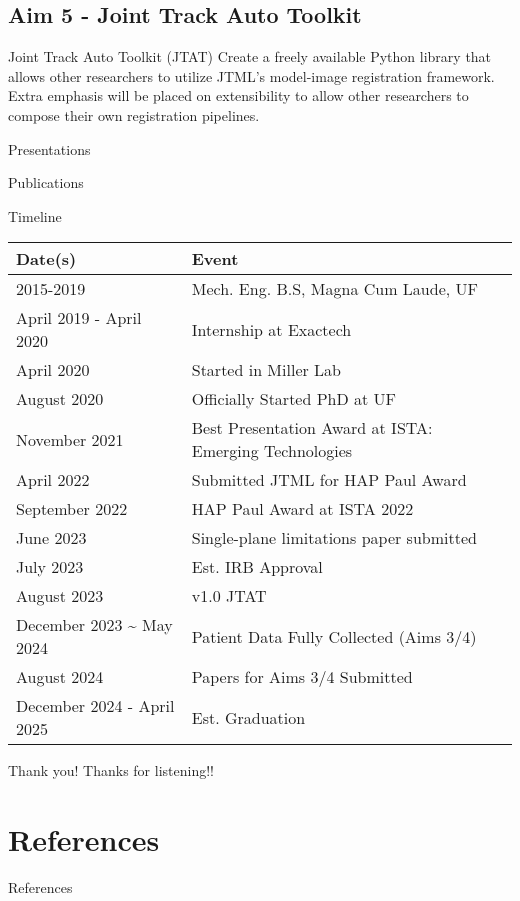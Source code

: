 \documentclass[presentation, aspectratio=1610]{beamer}
\begin{document}
\subsection{Aim 5 - Joint Track Auto Toolkit}
\label{sec:org3f12229}
\begin{frame}[label={sec:orgaa91c31}]{Joint Track Auto Toolkit (JTAT)}
Create a freely available Python library that allows other researchers to utilize JTML's model-image registration framework. Extra emphasis will be placed on extensibility to allow other researchers to compose their own registration pipelines.
\end{frame}
\begin{frame}[label={sec:org2bbc07a},fragile, allowframebreaks, label=]{Presentations}
\begin{refsection}
  
  \printbibliography[title=Presentations]
\end{refsection}
\end{frame}
\begin{frame}[label={sec:orgb14d0ae},fragile, allowframebreaks, label=]{Publications}
\begin{refsection}
  
  \printbibliography[title=Publications]
\end{refsection}
\end{frame}
\begin{frame}[label={sec:org6e15262}]{Timeline}
\begin{center}
\begin{tabular}{ll}
Date(s) & Event\\
\hline
2015-2019 & Mech. Eng. B.S, Magna Cum Laude, UF\\
April 2019 - April 2020 & Internship at Exactech\\
April 2020 & Started in Miller Lab\\
August 2020 & Officially Started PhD at UF\\
November 2021 & Best Presentation Award at ISTA: Emerging Technologies\\
April 2022 & Submitted JTML for HAP Paul Award\\
September 2022 & HAP Paul Award at ISTA 2022\\
\hline
June 2023 & Single-plane limitations paper submitted\\
July 2023 & Est. IRB Approval\\
August 2023 & v1.0 JTAT\\
December 2023 \textasciitilde{} May 2024 & Patient Data Fully Collected (Aims 3/4)\\
August 2024 & Papers for Aims 3/4 Submitted\\
December 2024 - April 2025 & Est. Graduation\\
\end{tabular}
\end{center}
\end{frame}
\begin{frame}[label={sec:org493e625},standout]{Thank you!}
Thanks for listening!!
\end{frame}
\section{References}
\label{sec:orgdae9405}
\begin{frame}[label={sec:orga2e2145},fragile, allowframebreaks, label=]{References}
\AtNextBibliography{\tiny}
\printbibliography
\end{frame}
\end{document}
